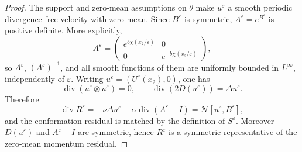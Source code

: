 \documentclass[11pt]{article}
\numberwithin{equation}{section}
\newcommand{\Id}{I}
\newcommand{\divv}{\operatorname{div}}
\newcommand{\calN}{\mathcal N}
\newcommand{\eps}{\varepsilon}
\begin{document}
\begin{proof}
The support and zero-mean assumptions on \(\theta\) make
\(u^\varepsilon\) a smooth periodic divergence-free velocity with zero mean.
Since \(B^\varepsilon\) is symmetric, \(A^\varepsilon=e^{B^\varepsilon}\) is
positive definite.  More explicitly,
\[
  A^\varepsilon
  =
  \begin{pmatrix}
  e^{b\chi(x_2/\eps)}&0\\
  0&e^{-b\chi(x_2/\eps)}
  \end{pmatrix},
\]
so \(A^\varepsilon\), \((A^\varepsilon)^{-1}\), and all smooth functions of
them are uniformly bounded in \(L^\infty\), independently of \(\eps\).
Writing \(u^\varepsilon=(U^\varepsilon(x_2),0)\), one has
\[
  \divv(u^\varepsilon\otimes u^\varepsilon)=0,\qquad
  \divv(2D(u^\varepsilon))=\Delta u^\varepsilon.
\]
Therefore
\[
  \divv R^\varepsilon
  =
  -\nu\Delta u^\varepsilon-\alpha\divv(A^\varepsilon-\Id)
  =
  \calN[u^\varepsilon,B^\varepsilon],
\]
and the conformation residual is matched by the definition of
\(S^\varepsilon\).  Moreover \(D(u^\varepsilon)\) and
\(A^\varepsilon-\Id\) are symmetric, hence \(R^\varepsilon\) is a symmetric
representative of the zero-mean momentum residual.


\end{proof}
\end{document}
